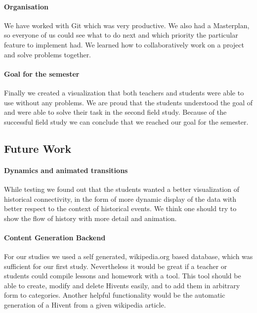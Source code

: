 \paragraph{Organisation} %
We have worked with Git which was very productive. We also had a Masterplan, so everyone of us could see what to do next and which priority the particular feature to implement had. We learned how to collaboratively work on a project and solve problems together.

\paragraph{Goal for the semester} %
Finally we created a visualization that both teachers and students were able to use without any problems. We are proud that the students understood the goal of \HG and were able to solve their task in the second field study. Because of the successful field study we can conclude that we reached our goal for the semester.

\subsection{Future Work} %
\label{sub:future_work}

\paragraph{Dynamics and animated transitions} %
\label{sub:dynamics_and_animated_transitions}
While testing \HG we found out that the students wanted a better visualization of historical connectivity, in the form of  more dynamic display of the data with better respect to the context of historical events. We think one should try to show the flow of history with more detail and animation.


\paragraph{Content Generation Backend} %
\label{sub:content_generation_backend}

For our studies we used a self generated, wikipedia.org based database, which was sufficient for our first study. Nevertheless it would be great if a teacher or students could compile lessons and homework with a tool. This tool should be able to create, modify and delete Hivents easily, and to add them in arbitrary form to categories.
Another helpful functionality would be the automatic generation of a Hivent from a given wikipedia article.

